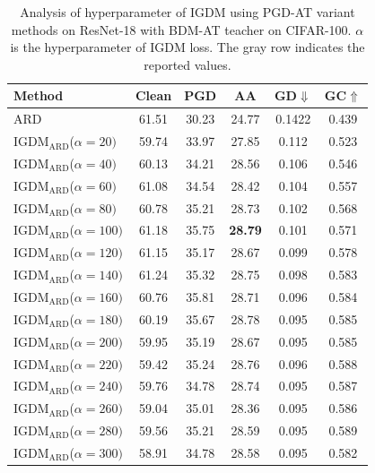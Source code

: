 \documentclass{article} %
\begin{document}
\begin{table}[h]
 \centering
 \caption{Analysis of hyperparameter of IGDM using PGD-AT variant methods on ResNet-18 with BDM-AT teacher on CIFAR-100. $\alpha$ is the hyperparameter of IGDM loss. The gray row indicates the reported values.}
 \setlength{\tabcolsep}{14pt}
 \begin{tabular}{lccccc}
 \toprule

 Method& Clean & PGD & AA & GD$\Downarrow$ & GC$\Uparrow$ \\
\midrule
 ARD \citep{ard}& 61.51 & 30.23 & 24.77 & 0.1422 & 0.439 
\\
 IGDM$_\text{ARD}$($\alpha=20)$  & 59.74 & 33.97 & 27.85 & 0.112 & 0.523
\\
 IGDM$_\text{ARD}$($\alpha=40)$ & 60.13& 34.21& 28.56& 0.106 & 0.546
\\
 IGDM$_\text{ARD}$($\alpha=60)$& 61.08& 34.54& 28.42& 0.104& 0.557\\
 IGDM$_\text{ARD}$($\alpha=80)$& 60.78& 35.21& 28.73& 0.102& 0.568\\
 \rowcolor{gray!30}
 IGDM$_\text{ARD}$($\alpha=100)$& 61.18& 35.75& \textbf{28.79}& 0.101& 0.571\\
 IGDM$_\text{ARD}$($\alpha=120)$& 61.15& 35.17& 28.67& 0.099& 0.578\\
 IGDM$_\text{ARD}$($\alpha=140)$& 61.24& 35.32& 28.75& 0.098& 0.583\\
 IGDM$_\text{ARD}$($\alpha=160)$& 60.76& 35.81& 28.71& 0.096 & 0.584\\
 IGDM$_\text{ARD}$($\alpha=180)$& 60.19& 35.67& 28.78& 0.095 & 0.585\\
 IGDM$_\text{ARD}$($\alpha=200)$& 59.95& 35.19 & 28.67& 0.095 & 0.585
\\
 IGDM$_\text{ARD}$($\alpha=220)$& 59.42& 35.24& 28.76& 0.096 & 0.588\\
 IGDM$_\text{ARD}$($\alpha=240)$& 59.76& 34.78& 28.74& 0.095 & 0.587\\
 IGDM$_\text{ARD}$($\alpha=260)$& 59.04 & 35.01 & 28.36 & 0.095 & 0.586
\\
 IGDM$_\text{ARD}$($\alpha=280)$& 59.56 & 35.21 & 28.59 & 0.095 & 0.589
\\
 IGDM$_\text{ARD}$($\alpha=300)$& 58.91 & 34.78 & 28.58 & 0.095 & 0.582\\
\bottomrule
 \end{tabular}

 \label{tab:supp_hyper_ard}
\end{table}
\end{document}
